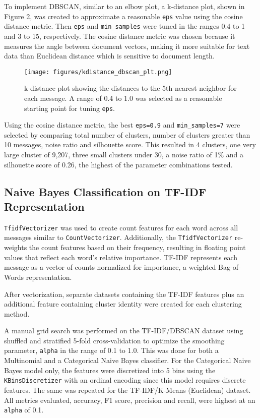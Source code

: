 \documentclass{article}      %
\begin{document}
To implement DBSCAN, similar to an elbow plot, a k-distance plot, shown in Figure 2, was created to approximate a reasonable \texttt{eps} value using the cosine distance metric. Then \texttt{eps} and \texttt{min\_samples} were tuned in the ranges 0.4 to 1 and 3 to 15, respectively. The cosine distance metric was chosen because it measures the angle between document vectors, making it more suitable for text data than Euclidean distance which is sensitive to document length.

\begin{figure}[!h]
	\centering
	\texttt{[image: figures/kdistance\_dbscan\_plt.png]}
	\caption{k-distance plot showing the distances to the 5th nearest neighbor for each message. A range of 0.4 to 1.0 was selected as a reasonable starting point for tuning \texttt{eps}.}
	\label{fig:dbscan_kdistance}
\end{figure}

Using the cosine distance metric, the best \texttt{eps=0.9} and \texttt{min\_samples=7} were selected by comparing total number of clusters, number of clusters greater than 10 messages, noise ratio and silhouette score. This resulted in 4 clusters, one very large cluster of 9,207, three small clusters under 30, a noise ratio of 1\% and a silhouette score of 0.26, the highest of the parameter combinations tested.

\subsection{Naive Bayes Classification on TF-IDF Representation}
\texttt{TfidfVectorizer} was used to create count features for each word across all messages similar to \texttt{CountVectorizer}. Additionally, the \texttt{TfidfVectorizer} re-weights the count features based on their frequency, resulting in floating point values that reflect each word's relative importance. TF-IDF represents each message as a vector of counts normalized for importance, a weighted Bag-of-Words representation.

After vectorization, separate datasets containing the TF-IDF features plus an additional feature containing cluster identity were created for each clustering method.

A manual grid search was performed on the TF-IDF/DBSCAN dataset using shuffled and stratified 5-fold cross-validation to optimize the smoothing parameter, \texttt{alpha} in the range of 0.1 to 1.0. This was done for both a Multinomial and a Categorical Naive Bayes classifier. For the Categorical Naive Bayes model only, the features were discretized into 5 bins using the \texttt{KBinsDiscretizer} with an ordinal encoding since this model requires discrete features. The same was repeated for the TF-IDF/K-Means (Euclidean) dataset. All metrics evaluated, accuracy, F1 score, precision and recall, were highest at an \texttt{alpha} of 0.1.
\end{document}
